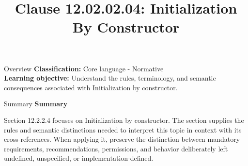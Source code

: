 \documentclass[10pt,letterpaper]{article}
\title{Clause 12.02.02.04: Initialization By Constructor}
\author{}
\date{}
\begin{document}
\maketitle
\begin{CornellOverviewBox}{Overview}
\textbf{Classification:} Core language - Normative\\[2pt]
\textbf{Learning objective:} Understand the rules, terminology, and semantic consequences associated with Initialization by constructor.
\end{CornellOverviewBox}\begin{CornellSummaryBox}{Summary}
{\sffamily\bfseries\color{Accent} Summary}\par\vspace{3pt}Section 12.2.2.4 focuses on Initialization by constructor. The section supplies the rules and semantic distinctions needed to interpret this topic in context with its cross-references. When applying it, preserve the distinction between mandatory requirements, recommendations, permissions, and behavior deliberately left undefined, unspecified, or implementation-defined.
\end{CornellSummaryBox}
\end{document}
